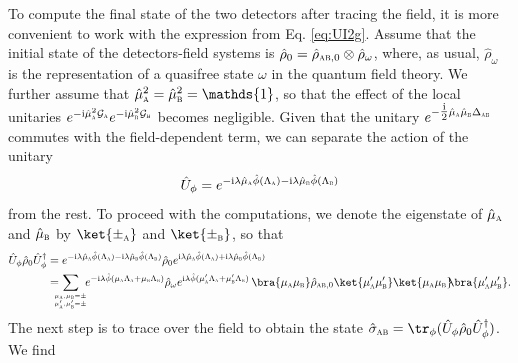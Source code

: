 \documentclass[letterpaper,12pt,titlepage,oneside,final]{book}
\newcommand{\openone}{\mathds{1}}
\newcommand{\ii}{\mathrm{i}}
\newcommand{\tc}[1]{\textsc{#1}}
\begin{document}
To compute the final state of the two detectors after tracing the field, it is more convenient to work with the expression from Eq. \eqref{eq:UI2g}. Assume that the initial state of the detectors-field systems is $\hat{\rho}_0 = \hat{\rho}_{\tc{ab},0}\otimes \hat{\rho}_\omega$, where, as usual, $\hat{\rho}_\omega$ is the representation of a quasifree state $\omega$ in the quantum field theory. We further assume that $\hat{\mu}_\tc{a}^2 = \hat{\mu}_\tc{b}^2 = \openone$, so that the effect of the local unitaries $e^{- \ii \hat{\mu}_\tc{a}^2\mathcal{G}_\tc{a}}e^{- \ii\hat{\mu}_\tc{b}^2 \mathcal{G}_\tc{b}}$ becomes negligible. Given that the unitary $e^{-  \tfrac{\ii}{2}\hat{\mu}_\tc{a}\hat{\mu}_\tc{b}\Delta_\tc{ab}}$ commutes with the field-dependent term, we can separate the action of the unitary
\begin{equation}
    \hat{U}_\phi = e^{- \ii \lambda\hat{\mu}_\tc{a}\hat{\phi}(\Lambda_\tc{a}) - \ii \lambda\hat{\mu}_\tc{b} \hat{\phi}(\Lambda_\tc{b})}
\end{equation}
from the rest. To proceed with the computations, we denote the eigenstate of $\hat{\mu}_\tc{a}$ and $\hat{\mu}_\tc{b}$ by $\ket{\pm_\tc{a}}$ and $\ket{\pm_\tc{b}}$, so that
\begin{align}
    \hat{U}_\phi \hat{\rho}_0\hat{U}_\phi^\dagger &= e^{- \ii \lambda\hat{\mu}_\tc{a}\hat{\phi}(\Lambda_\tc{a}) - \ii \lambda\hat{\mu}_\tc{b} \hat{\phi}(\Lambda_\tc{b})}\hat{\rho}_{0}e^{\ii \lambda\hat{\mu}_\tc{a}\hat{\phi}(\Lambda_\tc{a}) + \ii \lambda\hat{\mu}_\tc{b} \hat{\phi}(\Lambda_\tc{b})}\nonumber\\
    &=\!\!\!\!\sum_{{\substack{{}_{\mu_\tc{a},\mu_\tc{b} = \pm}\\{}_{\mu_\tc{a}',\mu_\tc{b}' = \pm}}}} \!\!e^{- \ii \lambda\hat{\phi}({\mu}_\tc{a}\Lambda_\tc{a}+{\mu}_\tc{b}\Lambda_\tc{b})}\hat{\rho}_\omega e^{\ii \lambda\hat{\phi}({\mu}_\tc{a}'\Lambda_\tc{a}+{\mu}_\tc{b}'\Lambda_\tc{b})}\nonumber\,\bra{\mu_\tc{a}\mu_{\tc{b}}}\hat{\rho}_{\tc{ab},0}\ket{\mu_\tc{a}'\mu_{\tc{b}}'}  \ket{\mu_\tc{a}\mu_{\tc{b}}}\!\!\bra{\mu_\tc{a}'\mu_{\tc{b}}'}.
\end{align}
The next step is to trace over the field to obtain the state $\hat{\sigma}_\tc{ab} = \tr_\phi(\hat{U}_\phi \hat{\rho}_0\hat{U}_\phi^\dagger)$. We find
\end{document}
